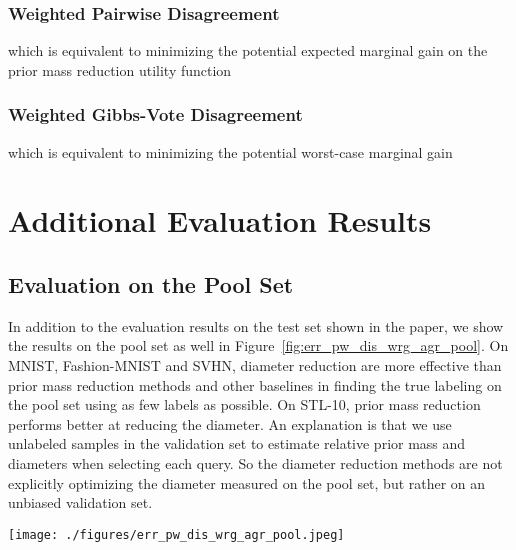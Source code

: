 \documentclass[runningheads, envcountsame, a4paper]{llncs}
\begin{document}
\subsubsection{Weighted Pairwise Disagreement} 
which is equivalent to minimizing the potential expected marginal gain on the prior mass reduction utility function


\subsubsection{Weighted Gibbs-Vote Disagreement} 
which is equivalent to minimizing the potential worst-case marginal gain 






\section{Additional Evaluation Results}
\subsection{Evaluation on the Pool Set}
In addition to the evaluation results on the test set shown in the paper, we show the results on the pool set as well in Figure~\ref{fig:err_pw_dis_wrg_agr_pool}. On MNIST, Fashion-MNIST and SVHN, diameter reduction are more effective than prior mass reduction methods and other baselines in finding the true labeling on the pool set using as few labels as possible. On STL-10, prior mass reduction performs better at reducing the diameter. An explanation is that we use unlabeled samples in the validation set to estimate relative prior mass and diameters when selecting each query. So the diameter reduction methods are not explicitly optimizing the diameter measured on the pool set, but rather on an unbiased validation set.  

\begin{figure*}[ht!]
\begin{center}
\texttt{[image: ./figures/err\_pw\_dis\_wrg\_agr\_pool.jpeg]}
\end{center}
   \caption{Error rate, pairwise disagreement and wrong agreement over number of queried labels on the pool set.}
\label{fig:err_pw_dis_wrg_agr_pool}
\end{figure*}
\end{document}
